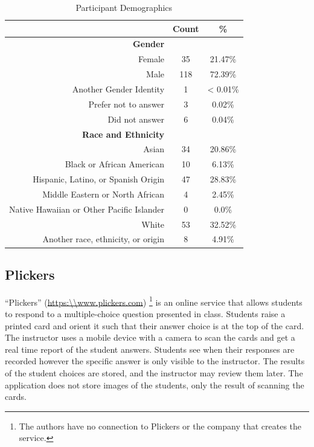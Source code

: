 \documentclass[12pt]{article}
\begin{document}
\begin{table}
\label{tab:demographics}
\centering
\begin{tabular}{r|c|c}
& Count & \% \\
\hline
\hline
\textbf{Gender}&&\\
\rowcolor{LightGray}
Female & 35 &  21.47\%\\
Male & 118 & 72.39\%\\
\rowcolor{LightGray}
Another Gender Identity & 1 &  < 0.01\%\\
Prefer not to answer & 3 & 0.02\%\\
\rowcolor{LightGray}
Did not answer & 6 & 0.04\% \\
\hline
\hline
\textbf{Race and Ethnicity}&&\\
\rowcolor{LightGray}
Asian  & 34 & 20.86\%\\
Black or African American & 10 & 6.13\%\\
\rowcolor{LightGray}
Hispanic, Latino, or Spanish Origin  & 47 & 28.83\%\\
Middle Eastern or North African  & 4 & 2.45\%\\
\rowcolor{LightGray}
Native Hawaiian or Other Pacific Islander & 0 & 0.0\%\\
White & 53 & 32.52\%\\
\rowcolor{LightGray}
Another race, ethnicity, or origin & 8 & 4.91\%\\
\hline
\end{tabular}
\caption{Participant Demographics}
\end{table}

\subsection{Plickers}
``Plickers'' (\url{https:\\www.plickers.com}) \footnote{The authors have no connection to Plickers or the company that creates the service.} is an online service that allows students to respond to a multiple-choice question presented in class. Students raise a printed card and orient it such that their answer choice is at the top of the card. The instructor uses a mobile device with a camera to scan the cards and get a real time report of the student answers. Students see when their responses are recorded however the specific answer is only visible to the instructor. The results of the student choices are stored, and the instructor may review them later. The application does not store images of the students, only the result of scanning the cards. 
\end{document}
